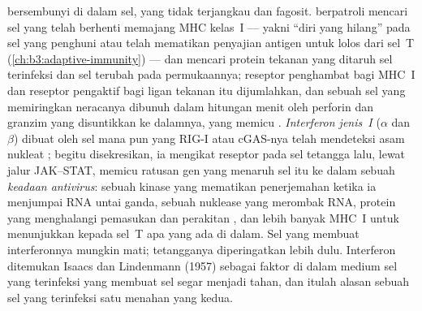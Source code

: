 \begin{definition}\label{def:b3:innate-immunity:nk-ifn}
%
 bersembunyi di dalam sel, yang tidak terjangkau  dan fagosit.
\emph{} berpatroli mencari sel yang telah
berhenti memajang MHC kelas~I --- yakni ``diri yang hilang'' pada sel yang
penghuni  atau  telah mematikan penyajian antigen untuk
lolos dari sel~T (\cref{ch:b3:adaptive-immunity}) --- dan mencari protein
tekanan yang ditaruh sel terinfeksi dan sel terubah pada permukaannya;
reseptor penghambat bagi MHC~I dan reseptor pengaktif bagi ligan tekanan
itu dijumlahkan, dan sebuah sel yang memiringkan neracanya dibunuh dalam
hitungan menit oleh perforin dan granzim yang disuntikkan ke dalamnya, yang
memicu . \emph{Interferon jenis~I} ($\alpha$ dan $\beta$) dibuat oleh
sel mana pun yang RIG-I atau cGAS-nya telah mendeteksi asam nukleat ;
begitu disekresikan, ia mengikat reseptor pada sel tetangga lalu, lewat jalur
JAK--STAT, memicu ratusan gen yang menaruh sel itu ke dalam sebuah
\emph{keadaan antivirus}: sebuah kinase yang mematikan penerjemahan ketika
ia menjumpai RNA untai ganda, sebuah nuklease yang merombak RNA, protein yang
menghalangi pemasukan dan perakitan , dan lebih banyak MHC~I untuk
menunjukkan kepada sel~T apa yang ada di dalam. Sel yang membuat interferonnya
mungkin mati; tetangganya diperingatkan lebih dulu. Interferon ditemukan Isaacs
dan Lindenmann (1957) sebagai faktor di dalam medium sel yang terinfeksi 
yang membuat sel segar menjadi tahan, dan itulah alasan sebuah sel yang
terinfeksi satu  menahan  yang kedua.
\end{definition}

